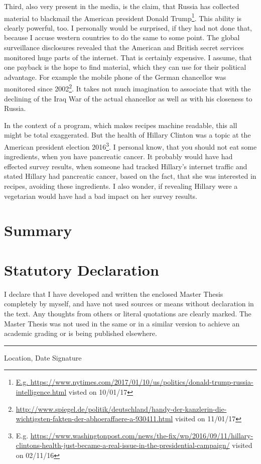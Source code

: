 \documentclass[12pt, twoside]{report}
\begin{document}
Third, also very present in the media, is the claim, that Russia has collected material to blackmail the American president Donald Trump\footnote{\url{E.g. https://www.nytimes.com/2017/01/10/us/politics/donald-trump-russia-intelligence.html} visted on 10/01/17}. This ability is clearly powerful, too. I personally would be surprised, if they had not done that, because I accuse western countries to do the same to some point. The global surveillance disclosures revealed that the American and British secret services monitored huge parts of the internet. That is certainly expensive. I assume, that one payback is the hope to find material, which they can use for their political advantage. For example the mobile phone of the German chancellor was monitored since 2002\footnote{\url{http://www.spiegel.de/politik/deutschland/handy-der-kanzlerin-die-wichtigsten-fakten-der-abhoeraffaere-a-930411.html} visited on 11/01/17}. It takes not much imagination to associate that with the declining of the Iraq War of the actual chancellor as well as with his closeness to Russia.

In the context of a program, which makes recipes machine readable, this all might be total exaggerated. But the health of Hillary Clinton was a topic at the American president election 2016\footnote{E.g. \url{https://www.washingtonpost.com/news/the-fix/wp/2016/09/11/hillary-clintons-health-just-became-a-real-issue-in-the-presidential-campaign/} visited on 02/11/16}. I personal know, that you should not eat some ingredients, when you have pancreatic cancer. It probably would have had effected survey results, when someone had tracked Hillary's internet traffic and stated Hillary had pancreatic cancer, based on the fact, that she was interested in recipes, avoiding these ingredients. I also wonder, if revealing Hillary were a vegetarian would have had a bad impact on her survey results. 


\chapter{Summary}


\appendix
\chapter{Statutory Declaration}
I declare that I have developed and written the enclosed Master Thesis completely by myself, and have not used sources or means without declaration in the text. Any thoughts from others or literal quotations are clearly marked. The Master Thesis was not used in the same or in a similar version to achieve an academic grading or is being published elsewhere.
\newline
\newline
\newline
\rule{\textwidth}{1pt}
Location, Date \hfill Signature 
\end{document}
